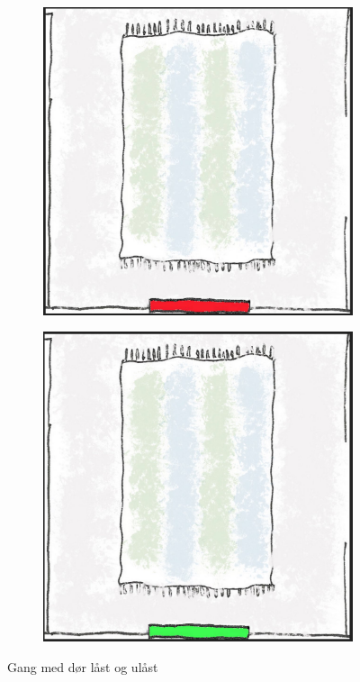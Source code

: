 \begin{figure}[ht]
\centering
\begin{subfigure}{0.32\textwidth}
\centering
\includegraphics[scale=0.1]{fig/hall}
\caption{}
\label{fig:halllocked}
\end{subfigure}
\begin{subfigure}{0.32\textwidth}
\centering
\includegraphics[scale=0.1]{fig/hall2}
\caption{}
\label{fig:hallopen}
\end{subfigure}
\caption{Gang med dør låst og ulåst}
\label{fig:halllockedopen}
\end{figure}

